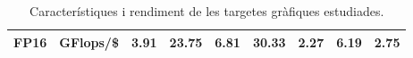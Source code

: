 \begin{table}[h]
\begin{adjustwidth}{-1.5in}{-1.5in}
\begin{center}
{\begin{tabular}{cc||c|c|c|c|c|c|c}
\multirow{-3}{*}{FP16}            & GFlops/\$                                                                              & 3.91                                                            & 23.75                                                            & 6.81                                                                 & 30.33                                                         & 2.27                                                                 & 6.19                                                                   & 2.75 \\ \hline
\end{tabular}
    }
\end{center}
\end{adjustwidth}
    \caption{Característiques i rendiment de les targetes gràfiques estudiades.}
    \label{tab:gpu_specs}
\end{table}
